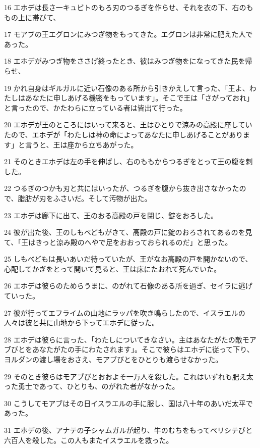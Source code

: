 \par 16 エホデは長さ一キュビトのもろ刃のつるぎを作らせ、それを衣の下、右のももの上に帯びて、
\par 17 モアブの王エグロンにみつぎ物をもってきた。エグロンは非常に肥えた人であった。
\par 18 エホデがみつぎ物をささげ終ったとき、彼はみつぎ物をになってきた民を帰らせ、
\par 19 かれ自身はギルガルに近い石像のある所から引きかえして言った、「王よ、わたしはあなたに申しあげる機密をもっています」。そこで王は「さがっておれ」と言ったので、かたわらに立っている者は皆出て行った。
\par 20 エホデが王のところにはいって来ると、王はひとりで涼みの高殿に座していたので、エホデが「わたしは神の命によってあなたに申しあげることがあります」と言うと、王は座から立ちあがった。
\par 21 そのときエホデは左の手を伸ばし、右のももからつるぎをとって王の腹を刺した。
\par 22 つるぎのつかも刃と共にはいったが、つるぎを腹から抜き出さなかったので、脂肪が刃をふさいだ。そして汚物が出た。
\par 23 エホデは廊下に出て、王のおる高殿の戸を閉じ、錠をおろした。
\par 24 彼が出た後、王のしもべどもがきて、高殿の戸に錠のおろされてあるのを見て、「王はきっと涼み殿のへやで足をおおっておられるのだ」と思った。
\par 25 しもべどもは長いあいだ待っていたが、王がなお高殿の戸を開かないので、心配してかぎをとって開いて見ると、王は床にたおれて死んでいた。
\par 26 エホデは彼らのためらうまに、のがれて石像のある所を過ぎ、セイラに逃げていった。
\par 27 彼が行ってエフライムの山地にラッパを吹き鳴らしたので、イスラエルの人々は彼と共に山地から下ってエホデに従った。
\par 28 エホデは彼らに言った、「わたしについてきなさい。主はあなたがたの敵モアブびとをあなたがたの手にわたされます」。そこで彼らはエホデに従って下り、ヨルダンの渡し場をおさえ、モアブびとをひとりも渡らせなかった。
\par 29 そのとき彼らはモアブびとおおよそ一万人を殺した。これはいずれも肥え太った勇士であって、ひとりも、のがれた者がなかった。
\par 30 こうしてモアブはその日イスラエルの手に服し、国は八十年のあいだ太平であった。
\par 31 エホデの後、アナテの子シャムガルが起り、牛のむちをもってペリシテびと六百人を殺した。この人もまたイスラエルを救った。


